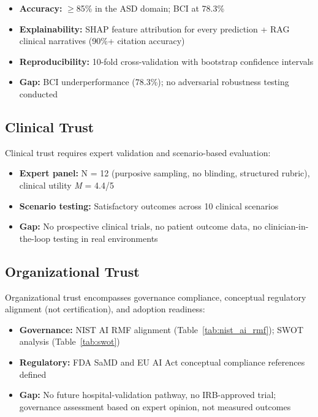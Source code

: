 \begin{itemize}
    \item \textbf{Accuracy:} $\geq$85\% in the ASD domain; BCI at 78.3\%
    \item \textbf{Explainability:} SHAP feature attribution for every prediction + RAG clinical narratives (90\%+ citation accuracy)
    \item \textbf{Reproducibility:} 10-fold cross-validation with bootstrap confidence intervals
    \item \textbf{Gap:} BCI underperformance (78.3\%); no adversarial robustness testing conducted
\end{itemize}

\subsection{Clinical Trust}

Clinical trust requires expert validation and scenario-based evaluation:

\begin{itemize}
    \item \textbf{Expert panel:} N = 12 (purposive sampling, no blinding, structured rubric), clinical utility \textit{M} = 4.4/5
    \item \textbf{Scenario testing:} Satisfactory outcomes across 10 clinical scenarios
    \item \textbf{Gap:} No prospective clinical trials, no patient outcome data, no clinician-in-the-loop testing in real environments
\end{itemize}

\subsection{Organizational Trust}

Organizational trust encompasses governance compliance, conceptual regulatory alignment (not certification), and adoption readiness:

\begin{itemize}
    \item \textbf{Governance:} NIST AI RMF alignment (Table~\ref{tab:nist_ai_rmf}); SWOT analysis (Table~\ref{tab:swot})
    \item \textbf{Regulatory:} FDA SaMD and EU AI Act conceptual compliance references defined
    \item \textbf{Gap:} No future hospital-validation pathway, no IRB-approved trial; governance assessment based on expert opinion, not measured outcomes
\end{itemize}
\fi

